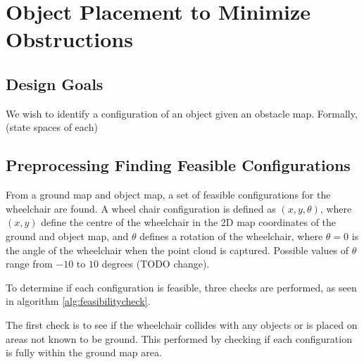 \chapter{Object Placement to Minimize Obstructions}
\label{ch:identify}


\section{Design Goals}
We wish to identify a configuration of an object given an obstacle map.
Formally, (state spaces of each)

\section{Preprocessing Finding Feasible Configurations}
\label{sec:feasibleparkingspot}


From a ground map and object map, a set of feasible configurations for the
wheelchair are found. A wheel chair configuration is defined as $(x,y,\theta)$,
where $(x,y)$ define the centre of the wheelchair in the 2D map coordinates of
the ground and object map, and $\theta$ defines a rotation of the wheelchair,
where $\theta = 0$ is the angle of the wheelchair when the point cloud is
captured. Possible values of $\theta$ range from $-10$ to $10$ degrees (TODO
change).

To determine if each configuration is feasible, three checks are performed, as
seen in algorithm \autoref{alg:feasibilitycheck}. 

The first check is to see if the wheelchair
collides with any objects or is placed on areas not known to be ground. This
performed by checking if each configuration is fully within the ground map area.

